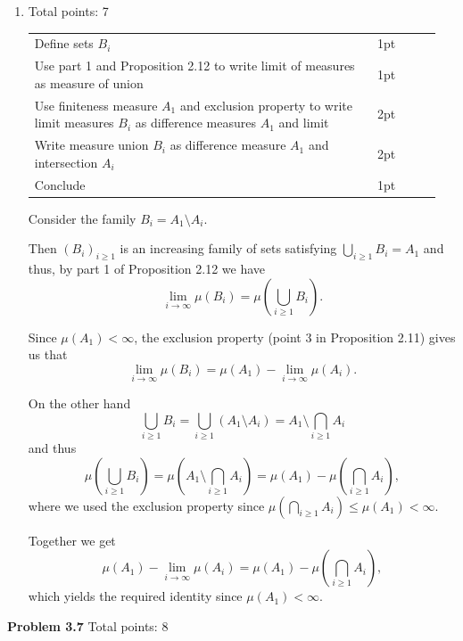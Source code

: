 \documentclass{lecturenotes}
\newcommand{\rubric}[1]{#1}
\begin{document}
\begin{enumerate}[label=(\alph*)]
Thus,
\[
	\lim_{i \to \infty} \mu(A_i) = \sum_{k = 1}^\infty \mu(E_k) = \mu\left(\bigcup_{i \ge 1} A_i\right),
\]
as required.
\item \rubric{ Total points: 7 \hfill

\begin{tabular}{p{0.8\linewidth}p{0.15\linewidth}}
\hline
Define sets $B_i$& 1pt\\
Use part 1 and Proposition 2.12 to write limit of measures as measure of union & 1pt\\
Use finiteness measure $A_1$ and exclusion property to write limit measures $B_i$ as difference measures $A_1$ and limit & 2pt\\
Write measure union $B_i$ as difference measure $A_1$ and intersection $A_i$ & 2pt\\
Conclude & 1pt\\
\hline
\end{tabular}

}

Consider the family $B_i = A_1 \setminus A_i$. 

Then $(B_i)_{i \ge 1}$ is an increasing family of sets satisfying $\bigcup_{i \ge 1} B_i = A_1$ and thus, by part 1 of Proposition 2.12 we have
\[
	\lim_{i \to \infty} \mu(B_i) = \mu\left(\bigcup_{i \ge 1} B_i\right).
\]

Since $\mu(A_1) < \infty$, the exclusion property (point 3 in Proposition 2.11) gives us that
\[
	\lim_{i \to \infty} \mu(B_i) = \mu(A_1) - \lim_{i \to \infty} \mu(A_i). 
\]

On the other hand
\[
	\bigcup_{i \ge 1} B_i = \bigcup_{i \ge 1} (A_1 \setminus A_i) = A_1 \setminus \bigcap_{i \ge 1} A_i
\]
and thus
\[
	\mu\left(\bigcup_{i \ge 1} B_i\right) = \mu\left(A_1 \setminus \bigcap_{i \ge 1} A_i\right)
	= \mu(A_1) - \mu\left(\bigcap_{i \ge 1} A_i\right),
\]
where we used the exclusion property since $ \mu\left(\bigcap_{i \ge 1} A_i\right) \le \mu(A_1) < \infty$.

Together we get
\[
	\mu(A_1) - \lim_{i \to \infty} \mu(A_i) = \mu(A_1) - \mu\left(\bigcap_{i \ge 1} A_i\right),
\]
which yields the required identity since $\mu(A_1) < \infty$.

\end{enumerate}

\textbf{Problem 3.7} \rubric{Total points: 8}
\end{document}
